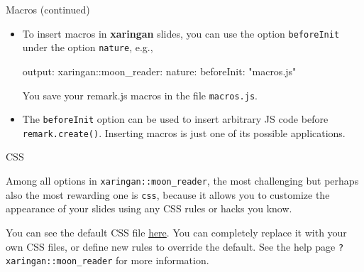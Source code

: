 \documentclass[ignorenonframetext,]{beamer}
\newenvironment{Shaded}{\begin{snugshade}}{\end{snugshade}}
\newcommand{\AttributeTok}[1]{\textcolor[rgb]{0.77,0.63,0.00}{#1}}
\newcommand{\FunctionTok}[1]{\textcolor[rgb]{0.00,0.00,0.00}{#1}}
\newcommand{\StringTok}[1]{\textcolor[rgb]{0.31,0.60,0.02}{#1}}
\begin{document}
\begin{frame}[fragile]{Macros (continued)}
\protect\hypertarget{macros-continued}{}

\begin{itemize}
\item
  To insert macros in \textbf{xaringan} slides, you can use the option
  \texttt{beforeInit} under the option \texttt{nature}, e.g.,

\begin{Shaded}
\begin{Highlighting}[]
\FunctionTok{output:}
  \FunctionTok{xaringan:}\AttributeTok{:moon_reader:}
    \FunctionTok{nature:}
      \FunctionTok{beforeInit:}\AttributeTok{ }\StringTok{"macros.js"}
\end{Highlighting}
\end{Shaded}

  You save your remark.js macros in the file \texttt{macros.js}.
\item
  The \texttt{beforeInit} option can be used to insert arbitrary JS code
  before \texttt{remark.create()}. Inserting macros is just one of its
  possible applications.
\end{itemize}

\end{frame}

\begin{frame}[fragile]{CSS}
\protect\hypertarget{css}{}

Among all options in \texttt{xaringan::moon\_reader}, the most
challenging but perhaps also the most rewarding one is \texttt{css},
because it allows you to customize the appearance of your slides using
any CSS rules or hacks you know.

You can see the default CSS file
\href{https://github.com/yihui/xaringan/blob/master/inst/rmarkdown/templates/xaringan/resources/default.css}{here}.
You can completely replace it with your own CSS files, or define new
rules to override the default. See the help page
\texttt{?xaringan::moon\_reader} for more information.

\end{frame}
\end{document}
